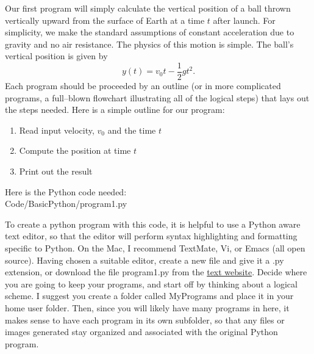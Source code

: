 Our first program will simply calculate the vertical position of a ball thrown vertically upward from the surface of Earth at a time $t$ after launch. For simplicity, we make the standard assumptions of constant acceleration due to gravity and no air resistance.
The physics of this motion is simple. The ball's vertical position is given by 
	\begin{equation}
		y(t) = v_0 t - \frac{1}{2}gt^2 .
	\end{equation}
Each program should be proceeded by an outline (or in more complicated programs, a full--blown flowchart illustrating all of the logical steps) that lays out the steps needed. Here is a simple outline for our program:
\begin{enumerate}
	\item Read input velocity, $v_0$ and the time $t$
	\item Compute the position at time $t$
	\item Print out the result
\end{enumerate}
 Here is the Python code needed: \\

{Code/BasicPython/program1.py}

To create a python program with this code, it is helpful to use a Python aware text editor, so that the editor will perform syntax highlighting and formatting specific to Python. On the Mac, I recommend TextMate, Vi, or Emacs (all open source). Having chosen a suitable editor, create a new file and give it a .py extension, or download the file program1.py from the \href{http://www.usm.maine.edu/~pauln/CompPhysPython}{text website}. Decide where you are going to keep your programs, and start off by thinking about a logical scheme. I suggest you create a folder called MyPrograms and place it in your home user folder. Then, since you will likely have many programs in here, it makes sense to have each program in its own subfolder, so that any files or images generated stay organized and associated with the original Python program.

